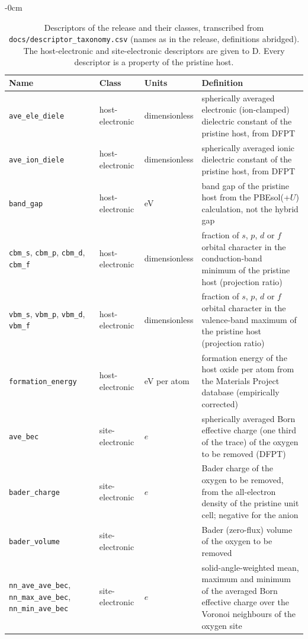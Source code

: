 \begin{table}[H]
\caption{Descriptors of the release and their classes, transcribed from \texttt{docs/descriptor\_taxonomy.csv} (names as in the release, definitions abridged). The host-electronic and site-electronic descriptors are given to D. Every descriptor is a property of the pristine host.\label{tab:app_taxonomy}}
\begin{adjustwidth}{-\extralength}{0cm}
\centering
\footnotesize
\begin{tabularx}{\linewidth}{@{}>{\raggedright\arraybackslash}Xll>{\raggedright\arraybackslash}X@{}}
\toprule
Name & Class & Units & Definition \\
\midrule
\texttt{ave\_ele\_diele} & host-electronic & dimensionless & spherically averaged electronic (ion-clamped) dielectric constant of the pristine host, from DFPT \\
\texttt{ave\_ion\_diele} & host-electronic & dimensionless & spherically averaged ionic dielectric constant of the pristine host, from DFPT \\
\texttt{band\_gap} & host-electronic & eV & band gap of the pristine host from the PBEsol(+$U$) calculation, not the hybrid gap \\
\texttt{cbm\_s}, \texttt{cbm\_p}, \texttt{cbm\_d}, \texttt{cbm\_f} & host-electronic & dimensionless & fraction of $s$, $p$, $d$ or $f$ orbital character in the conduction-band minimum of the pristine host (projection ratio) \\
\texttt{vbm\_s}, \texttt{vbm\_p}, \texttt{vbm\_d}, \texttt{vbm\_f} & host-electronic & dimensionless & fraction of $s$, $p$, $d$ or $f$ orbital character in the valence-band maximum of the pristine host (projection ratio) \\
\texttt{formation\_energy} & host-electronic & eV per atom & formation energy of the host oxide per atom from the Materials Project database (empirically corrected) \\
\addlinespace
\texttt{ave\_bec} & site-electronic & $e$ & spherically averaged Born effective charge (one third of the trace) of the oxygen to be removed (DFPT) \\
\texttt{bader\_charge} & site-electronic & $e$ & Bader charge of the oxygen to be removed, from the all-electron density of the pristine unit cell; negative for the anion \\
\texttt{bader\_volume} & site-electronic & \AAcube{} & Bader (zero-flux) volume of the oxygen to be removed \\
\texttt{nn\_ave\_ave\_bec}, \texttt{nn\_max\_ave\_bec}, \texttt{nn\_min\_ave\_bec} & site-electronic & $e$ & solid-angle-weighted mean, maximum and minimum of the averaged Born effective charge over the Voronoi neighbours of the oxygen site \\

\end{tabularx}
\end{adjustwidth}
\end{table}
